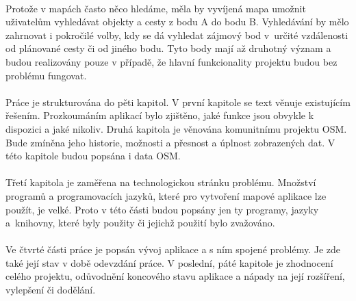 \documentclass[11pt,a4paper,titlepage,oneside]{book}
\begin{document}
	\paragraph{} Protože v mapách často něco hledáme, měla by vyvíjená mapa umožnit uživatelům vyhledávat objekty a cesty z bodu A do bodu B. Vyhledávání by mělo zahrnovat i pokročilé volby, kdy se dá vyhledat zájmový bod v~určité vzdálenosti od plánované cesty či od jiného bodu. Tyto body mají až druhotný význam a budou realizovány pouze v případě, že hlavní funkcionality projektu budou bez problému fungovat.





	\paragraph{} Práce je strukturována do pěti kapitol. V první kapitole se text věnuje existujícím řešením. Prozkoumáním aplikací bylo zjištěno, jaké funkce jsou obvykle k dispozici a jaké nikoliv. Druhá kapitola je věnována  komunitnímu projektu \ac{OSM}. Bude zmíněna jeho historie, možnosti a přesnost a úplnost zobrazených dat. V této kapitole budou popsána i data \ac{OSM}. 
	\paragraph{}Třetí kapitola je zaměřena na technologickou stránku problému. Množství programů a programovacích jazyků, které pro vytvoření mapové aplikace lze použít, je velké. Proto v této části budou popsány jen ty programy, jazyky a~knihovny, které byly použity či  jejichž použití bylo zvažováno.
	\paragraph{}Ve čtvrté části práce je popsán vývoj aplikace a s ním spojené problémy. Je zde také její stav v době odevzdání práce. V poslední, páté kapitole je zhodnocení celého projektu, odůvodnění koncového stavu aplikace a nápady na její rozšíření, vylepšení či dodělání.
	
\end{document}

